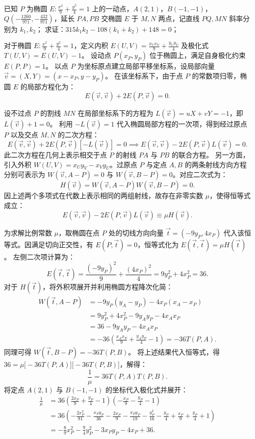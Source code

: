 \begin{exercise}
已知 \(P\) 为椭圆 \(E: \frac{x^2}{9} + \frac{y^2}{4} = 1\) 上的一动点，\(A(2,1)\)，\(B(-1,-1)\)，\(Q\left(-\frac{1260}{971}, -\frac{432}{971}\right)\)，延长 \(PA,PB\) 交椭圆 \(E\) 于 \(M,N\) 两点，记直线 \(PQ,MN\) 斜率分别为 \(k_1,k_2\)；
求证：\(315k_1k_2 - 108(k_1 + k_2) + 148 = 0\)；
\end{exercise}
\begin{solution}
对于椭圆 $E: \frac{x^2}{9} + \frac{y^2}{4} = 1$，定义内积 $E(U,V) = \frac{x_U x_V}{9} + \frac{y_U y_V}{4}$ 及极化式 $T(U,V) = E(U,V) - 1$。
设动点 $P(x_P, y_P)$ 位于椭圆上，满足自身极化约束 $E(P,P) = 1$。
以点 $P$ 为坐标原点建立局部平移坐标系，设局部向量 $\vec{v} = (X, Y) = (x-x_P, y-y_P)$。
在该坐标系下，由于点 $P$ 的常数项归零，椭圆 $E$ 的局部方程化为：
\[ E(\vec{v}, \vec{v}) + 2E(P, \vec{v}) = 0. \]

设不过点 $P$ 的割线 $MN$ 在局部坐标系下的方程为 $L(\vec{v}) = uX + vY = -1$，即 $L(\vec{v}) + 1 = 0$。
利用 $-L(\vec{v}) = 1$ 代入椭圆局部方程的一次项，得到经过原点 $P$ 以及交点 $M, N$ 的二次方程：
\[ E(\vec{v}, \vec{v}) + 2E(P, \vec{v})[-L(\vec{v})] = 0 \implies E(\vec{v}, \vec{v}) - 2E(P, \vec{v})L(\vec{v}) = 0. \]
此二次方程在几何上表示相交于点 $P$ 的射线 $PA$ 与 $PB$ 的联合方程。
另一方面，引入外积 $W(U,V) = x_U y_V - x_V y_U$。过原点 $P$ 与定点 $A, B$ 的两条射线方向方程分别可表示为 $W(\vec{v}, A-P) = 0$ 与 $W(\vec{v}, B-P) = 0$。对应二次式为：
\[ H(\vec{v}) = W(\vec{v}, A-P) W(\vec{v}, B-P) = 0. \]
因上述两个多项式在代数上表示相同的两组射线，故存在非零实数 $\mu$，使得恒等式成立：
\[ E(\vec{v}, \vec{v}) - 2E(P, \vec{v})L(\vec{v}) \equiv \mu H(\vec{v}). \]

为求解比例常数 $\mu$，取椭圆在点 $P$ 处的切线方向向量 $\vec{t} = (-9y_P, 4x_P)$ 代入该恒等式。因满足切向正交性，有 $E(P, \vec{t}) = 0$，恒等式化为 $E(\vec{t}, \vec{t}) = \mu H(\vec{t})$。
左侧二次项计算为：
\[ E(\vec{t}, \vec{t}) = \frac{(-9y_P)^2}{9} + \frac{(4x_P)^2}{4} = 9y_P^2 + 4x_P^2 = 36. \]
对于 $H(\vec{t})$，将外积项展开并利用椭圆方程降次化简：
\begin{align*}
W(\vec{t}, A-P) &= -9y_P(y_A - y_P) - 4x_P(x_A - x_P) \\
&= 9y_P^2 + 4x_P^2 - 9y_A y_P - 4x_A x_P \\
&= 36 - 9y_A y_P - 4x_A x_P \\
&= -36\left(\frac{x_A x_P}{9} + \frac{y_A y_P}{4} - 1\right) = -36T(P, A).
\end{align*}
同理可得 $W(\vec{t}, B-P) = -36T(P, B)$。
将上述结果代入恒等式，得 $36 = \mu \big[-36T(P, A)\big]\big[-36T(P, B)\big]$，解得：
\[ \frac{1}{\mu} = 36T(P, A)T(P, B). \]
将定点 $A(2, 1)$ 与 $B(-1, -1)$ 的坐标代入极化式并展开：
\begin{align*}
\frac{1}{\mu} &= 36 \left(\frac{2x_P}{9} + \frac{y_P}{4} - 1\right) \left(-\frac{x_P}{9} - \frac{y_P}{4} - 1\right) \\
&= 36 \left(-\frac{2x_P^2}{81} - \frac{x_P y_P}{36} - \frac{2x_P}{9} - \frac{x_P y_P}{18} - \frac{y_P^2}{16} - \frac{y_P}{4} + \frac{x_P}{9} + \frac{y_P}{4} + 1\right) \\
&= -\frac{8}{9}x_P^2 - \frac{9}{4}y_P^2 - 3x_P y_P - 4x_P + 36.
\end{align*}


\end{solution}
